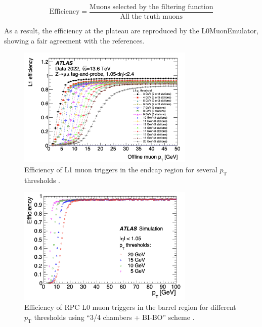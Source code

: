 \begin{equation}
\label{eq:emulator_efficiency}
\mathrm{Efficiency} = \frac{\text{Muons selected by the filtering function}}{\text{All the truth muons}}
\end{equation}

As a result, the efficiency at the plateau are reproduced by the L0MuonEmulator, showing a fair agreement with the references.

\begin{figure}[htbp]
  \centering
  \includegraphics[width=0.75\textwidth]{figs/chapter4/L1Muon_endcap_eff.png}
  \caption{Efficiency of L1 muon triggers in the endcap region for several $p_\mathrm{T}$ thresholds \cite{ATLASRun3Trigger}.}
  \label{fig:L1MuonEndcapEff}
\end{figure}

\begin{figure}[htbp]
  \centering
  \includegraphics[width=0.75\textwidth]{figs/chapter4/L0Muon_barrel_eff.png}
  \caption{Efficiency of RPC L0 muon triggers in the barrel region for different $p_\mathrm{T}$ thresholds using ``3/4 chambers + BI-BO'' scheme \cite{TDAQ_TDR}.}
  \label{fig:L0MuonBarrelEff}
\end{figure}


